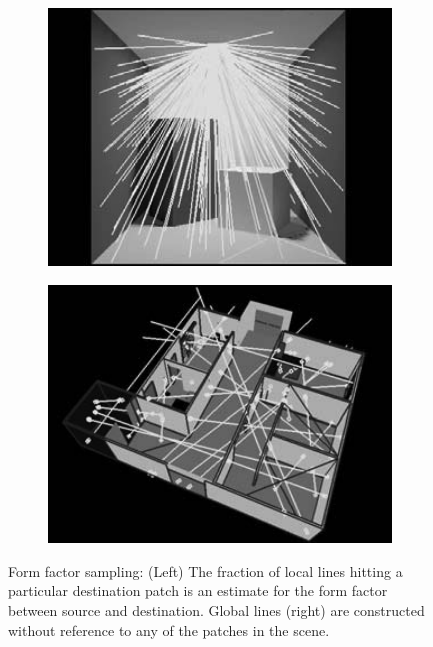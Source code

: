 \begin{figure}\label{f:sampling-methods}
	\begin{subfigure}[b]{0.5\textwidth}
		\includegraphics[width=1.0\textwidth]{graphics/gi/path-21-1}
	\end{subfigure}
	\begin{subfigure}[b]{0.5\textwidth}
		\includegraphics[width=1.0\textwidth]{graphics/gi/path-21-2}
	\end{subfigure}
	\caption{Form factor sampling: (Left) The fraction of local lines hitting a particular destination patch is an estimate for the form factor between source and destination. Global lines (right) are constructed without reference to any of the patches in the scene.}
\end{figure}

